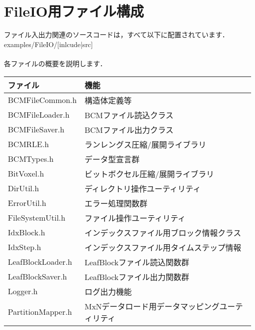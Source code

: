\documentclass[twoside]{jbook}
\begin{document}
\section{FileIO用ファイル構成}
ファイル入出力関連のソースコードは，すべて以下に配置されています． \\
examples/FileIO/[inlcude|src] \\
 \\
各ファイルの概要を説明します． \\
\begin{table}[h]
  \begin{tabular}{|l|l|} \hline
	ファイル & 機能 \\ \hline \hline
	BCMFileCommon.h & 構造体定義等 \\
	BCMFileLoader.h & BCMファイル読込クラス \\
	BCMFileSaver.h & BCMファイル出力クラス \\
	BCMRLE.h & ランレングス圧縮/展開ライブラリ \\
	BCMTypes.h & データ型宣言群 \\
	BitVoxel.h & ビットボクセル圧縮/展開ライブラリ \\
	DirUtil.h & ディレクトリ操作ユーティリティ \\
	ErrorUtil.h & エラー処理関数群 \\
	FileSystemUtil.h & ファイル操作ユーティリティ \\
	IdxBlock.h & インデックスファイル用ブロック情報クラス \\
	IdxStep.h & インデックスファイル用タイムステップ情報 \\
	LeafBlockLoader.h & LeafBlockファイル読込関数群 \\
	LeafBlockSaver.h & LeafBlockファイル出力関数群 \\
	Logger.h & ログ出力機能 \\
	PartitionMapper.h & MxNデータロード用データマッピングユーティリティ\\ \hline
  \end{tabular}
\end{table}
 \\
 \\
\end{document}
